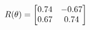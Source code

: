 \documentclass[preview]{standalone}
\begin{document}
\begin{align*}
\special{dvisvgm:raw <g id='unique000'>}R(\theta) = \begin{bmatrix}0.74 & -0.67\\0.67 & 0.74\end{bmatrix}\special{dvisvgm:raw </g>}
\end{align*}
\end{document}

